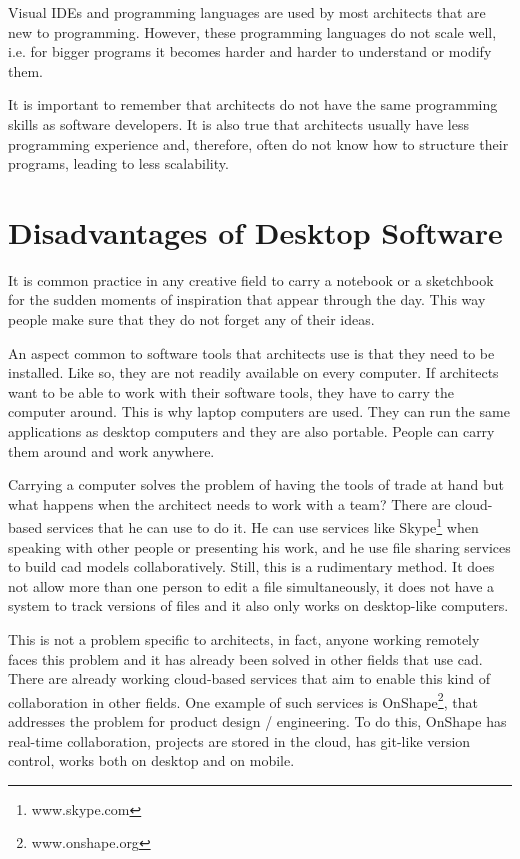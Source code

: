 Visual IDEs and programming languages are used by most architects that are new to programming.
However, these programming languages do not scale well, i.e. for bigger programs it becomes harder and harder to understand or modify them.

It is important to remember that architects do not have the same programming skills as software developers.
It is also true that architects usually have less programming experience and, therefore, often do not know how to structure their programs, leading to less scalability.


\section{Disadvantages of Desktop Software}
It is common practice in any creative field to carry a notebook or a sketchbook for the sudden moments of inspiration that appear through the day.
This way people make sure that they do not forget any of their ideas.

An aspect common to software tools that architects use is that they need to be installed.
Like so, they are not readily available on every computer.
If architects want to be able to work with their software tools, they have to carry the computer around.
This is why laptop computers are used.
They can run the same applications as desktop computers and they are also portable.
People can carry them around and work anywhere.

Carrying a computer solves the problem of having the tools of trade at hand but what happens when the architect needs to work with a team?
There are cloud-based services that he can use to do it.
He can use services like Skype\footnote{www.skype.com} when speaking with other people or presenting his work, and he use file sharing services to build \gls{cad} models collaboratively.
Still, this is a rudimentary method.
It does not allow more than one person to edit a file simultaneously, it does not have a system to track versions of files and it also only works on desktop-like computers.

This is not a problem specific to architects, in fact, anyone working remotely faces this problem and it has already been solved in other fields that use \gls{cad}.
There are already working cloud-based services that aim to enable this kind of collaboration in other fields.
One example of such services is OnShape\footnote{www.onshape.org}, that addresses the problem for product design / engineering.
To do this, OnShape has real-time collaboration, projects are stored in the cloud, has git-like version control, works both on desktop and on mobile.



